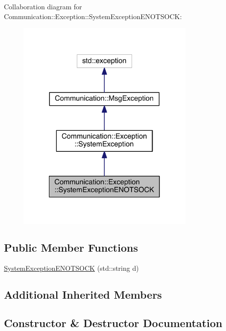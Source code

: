 Collaboration diagram for Communication\+:\+:Exception\+:\+:System\+Exception\+E\+N\+O\+T\+S\+O\+C\+K\+:\nopagebreak
\begin{figure}[H]
\begin{center}
\leavevmode
\includegraphics[width=248pt]{class_communication_1_1_exception_1_1_system_exception_e_n_o_t_s_o_c_k__coll__graph}
\end{center}
\end{figure}
\subsection*{Public Member Functions}
\begin{DoxyCompactItemize}
\item 
\hyperlink{class_communication_1_1_exception_1_1_system_exception_e_n_o_t_s_o_c_k_a1ba124db3b71d3ec48921eed1d99004f}{System\+Exception\+E\+N\+O\+T\+S\+O\+C\+K} (std\+::string d)
\end{DoxyCompactItemize}
\subsection*{Additional Inherited Members}


\subsection{Constructor \& Destructor Documentation}
\hypertarget{class_communication_1_1_exception_1_1_system_exception_e_n_o_t_s_o_c_k_a1ba124db3b71d3ec48921eed1d99004f}{}
